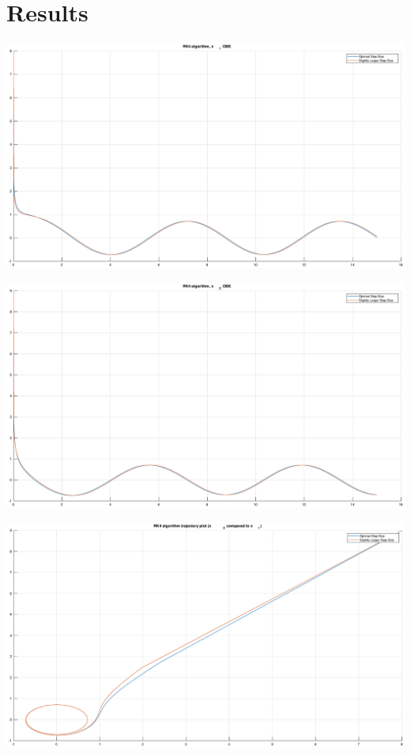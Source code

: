 \documentclass[12pt]{report}
\begin{document}
\section{Results}

\begin{center}
   \includegraphics[scale=0.25]{20.eps}
\end{center}

\begin{center}
   \includegraphics[scale=0.25]{21.eps}
\end{center}

\begin{center}
   \includegraphics[scale=0.25]{22.eps}
\end{center}
\end{document}
